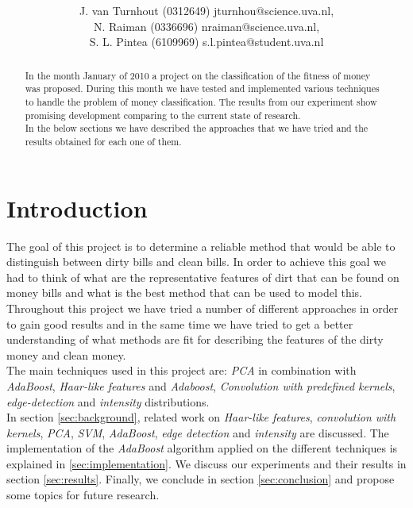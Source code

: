 \documentclass[11pt,twocolumn]{article}
\title{\tbf{Dirty Money:}\\\tbf{Feature selection using AdaBoost}}
\author{J. van Turnhout (0312649) jturnhou@science.uva.nl, \\ N. Raiman (0336696) nraiman@science.uva.nl, \\ S. L. Pintea (6109969) s.l.pintea@student.uva.nl}
\begin{document}
	\maketitle
	\begin{abstract}
	\hspace*{10px}In the month January of 2010 a project on the classification of the fitness of money was proposed. During this month we have tested and implemented various techniques to handle the problem of money classification. The results from our experiment show promising development comparing to the current state of research.\\
	\hspace*{10px}In the below sections we have described the approaches that we have tried and the results obtained for each one of them.
	\end{abstract}
	\section{Introduction}
	\hspace*{10px}The goal of this project is to determine a reliable method that would be able to distinguish between dirty bills and clean bills. In order to achieve this goal we had to think of what are the representative features of dirt that can be found on money bills and what is the best method that can be used to model this.\\ 
	\hspace*{10px}Throughout this project we have tried a number of different approaches in order to gain good results and in the same time we have tried to get a better understanding of what methods are fit for describing the features of the dirty money and clean money.\\
	\hspace*{10px}The main techniques used in this project are: \emph{PCA} in combination with \emph{AdaBoost}, \emph{Haar-like features} and \emph{Adaboost}, \emph{Convolution with predefined kernels}, \emph{edge-detection} and \emph{intensity} distributions.\\
	\hspace*{10px}In section \ref{sec:background}, related work on \emph{Haar-like features}, \emph{convolution with kernels}, \emph{PCA}, \emph{SVM}, \emph{AdaBoost}, \emph{edge detection} and \emph{intensity} are discussed. The implementation of the \emph{AdaBoost} algorithm applied on the different techniques is explained in \ref{sec:implementation}. We discuss our experiments and their results in section \ref{sec:results}. Finally, we conclude in section \ref{sec:conclusion} and propose some topics for future research.
\end{document}
